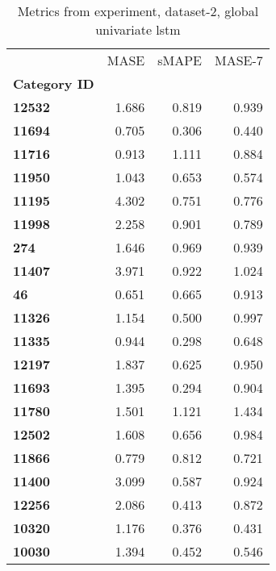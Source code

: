 \begin{table}[h]
\centering
\caption{Metrics from experiment, dataset-2, global univariate lstm}
\label{table:global-univariate-lstm-dataset-2}
\begin{tabular}{lrrr}
\toprule
{} &   MASE &  sMAPE &  MASE-7 \\
\textbf{Category ID} &        &        &         \\
\midrule
\textbf{12532      } &  1.686 &  0.819 &   0.939 \\
\textbf{11694      } &  0.705 &  0.306 &   0.440 \\
\textbf{11716      } &  0.913 &  1.111 &   0.884 \\
\textbf{11950      } &  1.043 &  0.653 &   0.574 \\
\textbf{11195      } &  4.302 &  0.751 &   0.776 \\
\textbf{11998      } &  2.258 &  0.901 &   0.789 \\
\textbf{274        } &  1.646 &  0.969 &   0.939 \\
\textbf{11407      } &  3.971 &  0.922 &   1.024 \\
\textbf{46         } &  0.651 &  0.665 &   0.913 \\
\textbf{11326      } &  1.154 &  0.500 &   0.997 \\
\textbf{11335      } &  0.944 &  0.298 &   0.648 \\
\textbf{12197      } &  1.837 &  0.625 &   0.950 \\
\textbf{11693      } &  1.395 &  0.294 &   0.904 \\
\textbf{11780      } &  1.501 &  1.121 &   1.434 \\
\textbf{12502      } &  1.608 &  0.656 &   0.984 \\
\textbf{11866      } &  0.779 &  0.812 &   0.721 \\
\textbf{11400      } &  3.099 &  0.587 &   0.924 \\
\textbf{12256      } &  2.086 &  0.413 &   0.872 \\
\textbf{10320      } &  1.176 &  0.376 &   0.431 \\
\textbf{10030      } &  1.394 &  0.452 &   0.546 \\
\bottomrule
\end{tabular}
\end{table}
